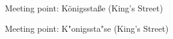 \documentclass{article}
\begin{document}
\parbox{3cm}{Meeting point: K\"onigssta\ss e (King's Street)}

\parbox{3cm}{Meeting point: K"onigssta"se (King's Street)}
\end{document}
